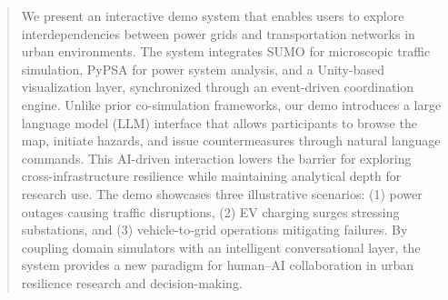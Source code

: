 \documentclass[sigconf,anonymous,review]{acmart}
\begin{document}
\renewcommand{\shortauthors}{Trovato et al.}

\begin{abstract}
    We present an interactive demo system that enables users to explore interdependencies between power grids and transportation networks in urban environments. The system integrates SUMO for microscopic traffic simulation, PyPSA for power system analysis, and a Unity-based visualization layer, synchronized through an event-driven coordination engine. Unlike prior co-simulation frameworks, our demo introduces a large language model (LLM) interface that allows participants to browse the map, initiate hazards, and issue countermeasures through natural language commands. This AI-driven interaction lowers the barrier for exploring cross-infrastructure resilience while maintaining analytical depth for research use. The demo showcases three illustrative scenarios: (1) power outages causing traffic disruptions, (2) EV charging surges stressing substations, and (3) vehicle-to-grid operations mitigating failures. By coupling domain simulators with an intelligent conversational layer, the system provides a new paradigm for human–AI collaboration in urban resilience research and decision-making.
\end{abstract}
\end{document}
